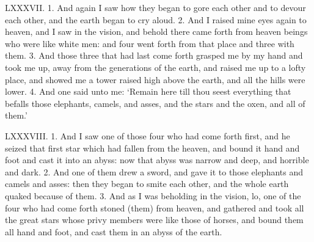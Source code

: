 
LXXXVII. 1. And again I saw how they began to
gore each other and to devour each other, and the
earth began to cry aloud. 2. And I raised mine
eyes again to heaven, and I saw in the vision, and
behold there came forth from heaven beings who were
like white men: and four went forth from that place
and three with them. 3. And those three that had
last come forth grasped me by my hand and took me
up, away from the generations of the earth, and raised
me up to a lofty place, and showed me a tower raised
high above the earth, and all the hills were lower.
4. And one said unto me: ‘Remain here till thou
seest everything that befalls those elephants, camels,
and asses, and the stars and the oxen, and all of
them.’


LXXXVIII. 1. And I saw one of those four who
had come forth first, and he seized that first star which
had fallen from the heaven, and bound it hand and
foot and cast it into an abyss: now that abyss was
narrow and deep, and horrible and dark. 2. And one
of them drew a sword, and gave it to those elephants
and camels and asses: then they began to smite each
other, and the whole earth quaked because of them.
3. And as I was beholding in the vision, lo, one of the
four who had come forth stoned (them) from heaven,
and gathered and took all the great stars whose privy
members were like those of horses, and bound them
all hand and foot, and cast them in an abyss of the
earth.


